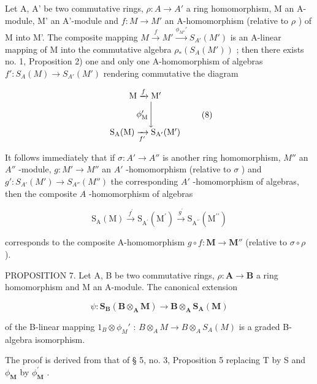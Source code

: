 Let A, A' be two commutative rings, \(\rho: A \to A'\) a ring homomorphism, M an A-module, M' an A'-module and \(f: M \to M'\) an A-homomorphism (relative to \(\rho\) ) of M into M'. The composite mapping \(M \xrightarrow{f} M' \xrightarrow{\phi_{M'}'} S_{A'}(M')\) is an A-linear mapping of M into the commutative algebra \(\rho_*(S_A(M'))\) ; then there exists no. 1, Proposition 2) one and only one A-homomorphism of algebras \(f': S_A(M) \to S_{A'}(M')\) rendering commutative the diagram

\[
\begin{array}{c} \mathrm{M} \xrightarrow {f} \mathrm{M} ^ {\prime} \\ \phi_ {\mathrm{M}} ^ {\prime} \Biggl \downarrow \\ \mathrm{S} _ {\mathrm{A}} (\mathrm{M}) \xrightarrow [ f ^ {\prime} ]{} \mathrm{S} _ {\mathrm{A} ^ {\prime}} (\mathrm{M} ^ {\prime}) \end{array}\tag{8}
\]

It follows immediately that if \(\sigma: A' \to A''\) is another ring homomorphism, \(M''\) an \(A''\) -module, \(g: M' \to M''\) an \(A'\) -homomorphism (relative to \(\sigma\) ) and \(g': S_{A'}(M') \to S_{A''}(M'')\) the corresponding \(A'\) -homomorphism of algebras, then the composite \(A\) -homomorphism of algebras

\[
\mathrm{S} _ {\mathrm{A}} (\mathrm{M}) \xrightarrow {f ^ {\prime}} \mathrm{S} _ {\mathrm{A} ^ {\prime}} \left(\mathrm{M} ^ {\prime}\right) \xrightarrow {g ^ {\prime}} \mathrm{S} _ {\mathrm{A} ^ {\prime \prime}} \left(\mathrm{M} ^ {\prime \prime}\right)\tag{9}
\]

corresponds to the composite A-homomorphism \(g \circ f: \mathbf{M} \to \mathbf{M}''\) (relative to \(\sigma \circ \rho\) ).

PROPOSITION 7. Let A, B be two commutative rings, \(\rho: \mathbf{A} \to \mathbf{B}\) a ring homomorphism and M an A-module. The canonical extension

\[
\psi \colon \mathbf {S} _ {\mathbf {B}} (\mathbf {B} \otimes_ {\mathbf {A}} \mathbf {M}) \rightarrow \mathbf {B} \otimes_ {\mathbf {A}} \mathbf {S} _ {\mathbf {A}} (\mathbf {M})
\]

of the B-linear mapping \(1_{B} \otimes \phi_{M}'\) : \(B \otimes_{A} M \to B \otimes_{A} S_{A}(M)\) is a graded B-algebra isomorphism.

The proof is derived from that of § 5, no. 3, Proposition 5 replacing T by S and \(\phi_{\mathbf{M}}\) by \(\phi_{\mathbf{M}}^{\prime}\) .

